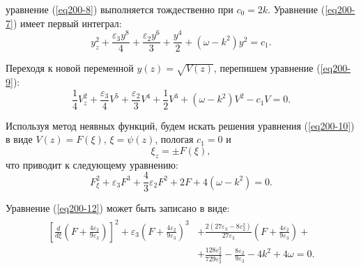 \documentclass[14pt,a4paper]{extreport}
\begin{document}
			уравнение (\ref{eq200-8}) выполняется тождественно при \(c_{0}=2k\). Уравнение (\ref{eq200-7}) имеет первый интеграл:
			\begin{equation} \label{eq200-9}
				y_{z}^{2}+\frac{\varepsilon_{3} y^{8} }{4}+\frac{\varepsilon_{2} y^{6} }{3}+\frac{ y^{4} }{2}+\left(\omega-k^{2}\right) y^{2} =c_{1}.
			\end{equation}

			Переходя к новой переменной \(y(z)=\sqrt{V(z)}\), перепишем уравнение (\ref{eq200-9}):
			\begin{equation} \label{eq200-10}
				\frac{ 1}{4}V_{z}^{2}+\frac{\varepsilon_{3}}{4}V^{5} +\frac{\varepsilon_{2}}{3}V^{4} +\frac{1}{2}V^{3}+\left( \omega- k^{2}\right)V^{2}-c_{1} V=0.
			\end{equation}

			Используя метод неявных функций, будем искать решения уравнения (\ref{eq200-10}) в виде \(V(z)=F(\xi),\,\xi=\psi(z)\), пологая \(c_{1}=0\) и
			\begin{equation} \label{eq200-11}
				\xi_{z}=\pm F(\xi),
			\end{equation}
			что приводит к следующему уравнению:
			\begin{equation}\label{eq200-12}
				F_{\xi}^{2}+\varepsilon_{3}F^{3}+\frac{4 }{3}\varepsilon_{2} F^{2}+2 F+4\left(\omega -k^{2}\right)=0.
			\end{equation}

			Уравнение (\ref{eq200-12}) может быть записано в виде:
			\begin{equation}\label{eq200-13}
				\begin{aligned}
					\begin{split}
					\left[\frac{d}{d\xi}\left(F+\frac{4 \varepsilon_{2}}{9 \varepsilon_{3}}\right)\right]^{2}+
					\varepsilon_{3}\left(F+\frac{4 \varepsilon_{2}}{9 \varepsilon_{3}}\right)^{3}&+
					\frac{2 (27 \varepsilon_{3} -8 \varepsilon_{2}^{2}) }{27 \varepsilon_{3}}\left(F+\frac{4 \varepsilon_{2}}{9 \varepsilon_{3}}\right)+\\
					&+\frac{128 \varepsilon_{2}^{3}}{729 \varepsilon_{3}^{2}}-\frac{8 \varepsilon_{2}}{9 \varepsilon_{3}}-4 k^{2}+4 \omega=0.
					\end{split}
				\end{aligned}
			\end{equation}
\end{document}
